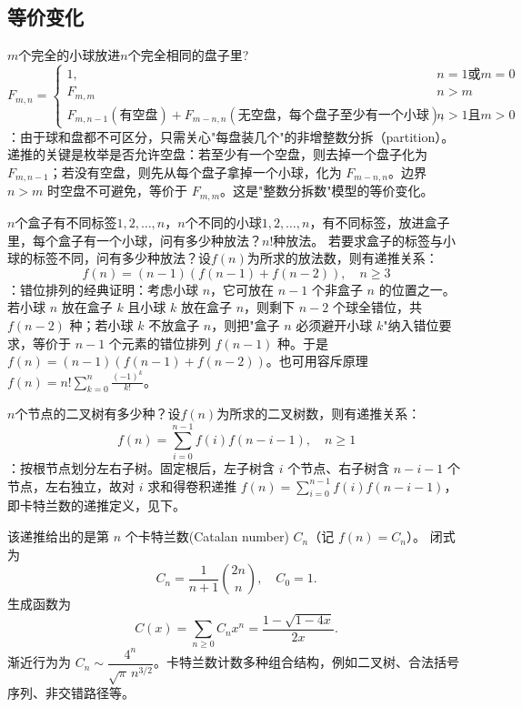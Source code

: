 \documentclass[12pt]{article}
\begin{document}
\subsection{等价变化}
\begin{exam}
  $m$个完全的小球放进$n$个完全相同的盘子里?
  \[
    F_{m,n}=\begin{cases}
      1,                                                       & n=1 \text{或} m=0 \\
      F_{m,m}                                                  & n>m              \\
      F_{m,n-1}(\text{有空盘})+F_{m-n,n}(\text{无空盘，每个盘子至少有一个小球}), & n>1 \text{且} m>0
    \end{cases}
  \]
  ：由于球和盘都不可区分，只需关心"每盘装几个"的非增整数分拆（partition）。递推的关键是枚举是否允许空盘：若至少有一个空盘，则去掉一个盘子化为 $F_{m,n-1}$；若没有空盘，则先从每个盘子拿掉一个小球，化为 $F_{m-n,n}$。边界 $n>m$ 时空盘不可避免，等价于 $F_{m,m}$。这是"整数分拆数"模型的等价变化。
\end{exam}
\begin{exam}[错位排序]
  $n$个盒子有不同标签$1,2,\ldots,n$，$n$个不同的小球$1,2,\ldots,n$，有不同标签，放进盒子里，每个盒子有一个小球，问有多少种放法？$n!$种放法。
  若要求盒子的标签与小球的标签不同，问有多少种放法？设$f(n)$为所求的放法数，则有递推关系：
  \[
    f(n)=(n-1)(f(n-1)+f(n-2)),\quad n\ge 3
  \]
  ：错位排列的经典证明：考虑小球 $n$，它可放在 $n-1$ 个非盒子 $n$ 的位置之一。若小球 $n$ 放在盒子 $k$ 且小球 $k$ 放在盒子 $n$，则剩下 $n-2$ 个球全错位，共 $f(n-2)$ 种；若小球 $k$ 不放盒子 $n$，则把"盒子 $n$ 必须避开小球 $k$"纳入错位要求，等价于 $n-1$ 个元素的错位排列 $f(n-1)$ 种。于是 $f(n)=(n-1)(f(n-1)+f(n-2))$。也可用容斥原理 $f(n)=n!\sum_{k=0}^{n}\frac{(-1)^k}{k!}$。
\end{exam}
\begin{exam}
  $n$个节点的二叉树有多少种？设$f(n)$为所求的二叉树数，则有递推关系：
  \[
    f(n)=\sum_{i=0}^{n-1} f(i)f(n-i-1),\quad n\ge 1
  \]
  ：按根节点划分左右子树。固定根后，左子树含 $i$ 个节点、右子树含 $n-i-1$ 个节点，左右独立，故对 $i$ 求和得卷积递推 $f(n)=\sum_{i=0}^{n-1}f(i)f(n-i-1)$，即卡特兰数的递推定义，见下。
\end{exam}
\begin{note}
  该递推给出的是第 $n$ 个卡特兰数(Catalan number) $C_n$（记 $f(n)=C_n$）。
  闭式为
  \[
    C_n=\frac{1}{n+1}\binom{2n}{n},\quad C_0=1.
  \]
  生成函数为
  \[
    C(x)=\sum_{n\ge0}C_nx^n=\frac{1-\sqrt{1-4x}}{2x}.
  \]
  渐近行为为 $C_n\sim\dfrac{4^n}{\sqrt{\pi}\,n^{3/2}}$。卡特兰数计数多种组合结构，例如二叉树、合法括号序列、非交错路径等。
\end{note}
\end{document}
